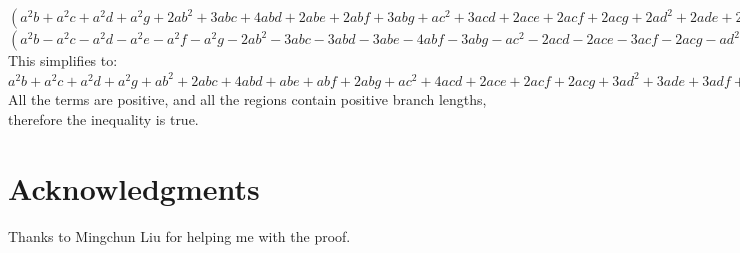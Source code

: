 \documentclass[10pt,letterpaper]{article}
\begin{document}
$(a^2b + a^2c + a^2d + a^2g + 2ab^2 + 3abc + 4abd + 2abe + 2abf + 3abg + ac^2 + 3acd + 2ace + 2acf + 2acg + 2ad^2 + 2ade + 2adf + 3adg + 2aeg + 2afg + ag^2 + b^3 + 2b^2c + 3b^2d + 2b^2e + 2b^2f + 2b^2g + bc^2 + 4bcd + 3bce + 3bcf + 3bcg + 3bd^2 + 4bde + 4bdf + 4bdg + be^2 + 2bef + 3beg + bf^2 + 3bfg + bg^2 + c^2d + c^2e + c^2f + c^2g + 2cd^2 + 3cde + 3cdf + 3cdg + ce^2 + 2cef + 2ceg + cf^2 + 2cfg + cg^2 + d^3 + 2d^2e + 2d^2f + 2d^2g + de^2 + 2def + 3deg + df^2 + 3dfg + dg^2 + e^2g + 2efg + eg^2 + f^2g + fg^2) -$\\[1ex]
$(a^2b - a^2c - a^2d - a^2e - a^2f - a^2g - 2ab^2 - 3abc - 3abd - 3abe - 4abf - 3abg - ac^2 - 2acd - 2ace - 3acf - 2acg - ad^2 - 2ade - 3adf - 2adg - ae^2 - 3aef - 2aeg - 2af^2 - 3afg - ag^2 - b^3 - 2b^2c - 2b^2d - 2b^2e - 3b^2f - 2b^2g - bc^2 - 2bcd - 2bce - 4bcf - 3bcg - bd^2 - 2bde - 4bdf - 3bdg - be^2 - 4bef - 3beg - 3bf^2 - 4bfg - bg^2 - c^2f - c^2g - 2cdf - 2cdg - 2cef - 2ceg - 2cf^2 - 3cfg - cg^2 - d^2f - d^2g - 2def - 2deg - 2df^2 - 3dfg - dg^2 - e^2f - e^2g - 2ef^2 - 3efg - eg^2 - f^3 - 2f^2g - fg^2) \ge 0$\\[3ex]
This simplifies to:
$a^2b + a^2c + a^2d + a^2g + ab^2 + 2abc+ 4abd + abe + abf + 2abg + ac^2 + 4acd + 2ace + 2acf + 2acg + 3ad^2 + 3ade + 3adf + 4adg + 2aeg + 2afg + ag^2 + + b^2c + 2b^2d + bc^2 + 5bcd + 3bce + 2bcf + 2bcg + 4bd^2 + 4bde + 4bdf + 3bdg + bfg + 2c^2d + 2c^2e + c^2f + c^2g + 4cd^2 + 6cde + 5cdf + 4cdg + 2ce^2 + 3cef + 2ceg + cf^2 + 2cfg + cg^2 + 2d^3 + 4d^2e + 4d^2f + 3d^2g + 2de^2 + 4def + 3deg + 2df^2 + 4dfg + dg^2 + + efg + 2f^2g \ge 0$\\[3ex]
All the terms are positive, and all the regions contain positive branch lengths, therefore the inequality is true.

\section*{Acknowledgments}
Thanks to Mingchun Liu for helping me with the proof.

\nolinenumbers

%
%
% 
%
%
\end{document}
